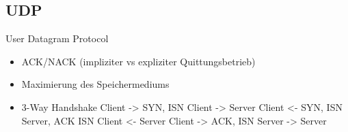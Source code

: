 \documentclass[10pt,a4paper]{article}
\begin{document}
	\subsection{UDP}
		User Datagram Protocol
	\begin{itemize}
		\item ACK/NACK (impliziter vs expliziter Quittungsbetrieb)
		\item Maximierung des Speichermediums
		\item 3-Way Handshake
		\subitem Client -> SYN, ISN Client -> Server
		\subitem Client <- SYN, ISN Server, ACK ISN Client <- Server
		\subitem Client -> ACK, ISN Server -> Server
	\end{itemize}
		
		
		
		
	
	
	
	
	
	
	
	
	
	
	
	
	
	
	
	
	
	
	
	
	
	
	
\end{document}
